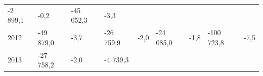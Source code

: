 \begin{longtable}[]{@{}lllllllll@{}}
\begin{minipage}[t]{0.12\columnwidth}
-2 899,1\strut
\end{minipage} & \begin{minipage}[t]{0.06\columnwidth}\raggedright
-0,2\strut
\end{minipage} & \begin{minipage}[t]{0.09\columnwidth}\raggedright
-45 052,3\strut
\end{minipage} & \begin{minipage}[t]{0.06\columnwidth}\raggedright
-3,3\strut
\end{minipage}\tabularnewline
\begin{minipage}[t]{0.05\columnwidth}\raggedright
2012\strut
\end{minipage} & \begin{minipage}[t]{0.10\columnwidth}\raggedright
-49 879,0\strut
\end{minipage} & \begin{minipage}[t]{0.06\columnwidth}\raggedright
-3,7\strut
\end{minipage} & \begin{minipage}[t]{0.16\columnwidth}\raggedright
-26 759,9\strut
\end{minipage} & \begin{minipage}[t]{0.06\columnwidth}\raggedright
-2,0\strut
\end{minipage} & \begin{minipage}[t]{0.12\columnwidth}\raggedright
-24 085,0\strut
\end{minipage} & \begin{minipage}[t]{0.06\columnwidth}\raggedright
-1,8\strut
\end{minipage} & \begin{minipage}[t]{0.09\columnwidth}\raggedright
-100 723,8\strut
\end{minipage} & \begin{minipage}[t]{0.06\columnwidth}\raggedright
-7,5\strut
\end{minipage}\tabularnewline
\begin{minipage}[t]{0.05\columnwidth}\raggedright
2013\strut
\end{minipage} & \begin{minipage}[t]{0.10\columnwidth}\raggedright
-27 758,2\strut
\end{minipage} & \begin{minipage}[t]{0.06\columnwidth}\raggedright
-2,0\strut
\end{minipage} & \begin{minipage}[t]{0.16\columnwidth}\raggedright
-4 739,3\strut

\end{minipage}
\end{longtable}
